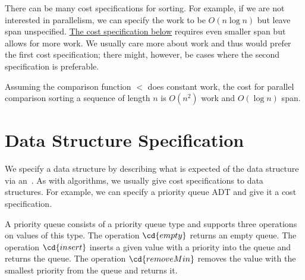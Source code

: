 \begin{cluster}
\label{grp:grm:introduction::spec::cost}

\begin{gram}
\label{grm:introduction::spec::cost}
There can be many cost specifications for sorting.  For example, if we
are not interested in parallelism, we can specify the work to be $O(n
\log{n})$ but leave span unspecified. 
\href{cost:intro::spec::sorting-inefficient}{The cost specification below}
requires even smaller span but allows for more work.
We usually care more about work and thus would prefer the first cost
specification; there might, however, be cases where the second
specification is preferable.

\end{gram}
\end{cluster}

\begin{cluster}
\label{grp:cost:intro::spec::sorting-inefficient}

\begin{costspec}
\label{cost:intro::spec::sorting-inefficient}
Assuming the comparison function $<$ does constant work, the cost for
parallel comparison sorting a sequence of length $n$ is $O(n^2)$ work
and $O(\log n)$ span.

\end{costspec}
\end{cluster}


\section{Data Structure Specification}
\label{sec:introduction::spec::data-structure-specification}

\begin{cluster}
\label{grp:grm:introduction::spec::data}

\begin{gram}
\label{grm:introduction::spec::data}
We specify a data structure by describing what is expected of the data
structure via an~.
As with algorithms, we usually give cost specifications to data
structures.
For example, we can specify a priority queue ADT and give it a cost
specification. 

\end{gram}
\end{cluster}

\begin{cluster}
\label{grp:adt:introduction::spec::priority-queue}

\begin{datatype}
\label{adt:introduction::spec::priority-queue}
A priority queue consists of a priority queue type and supports three
operations on values of this type.  The operation $\cd{empty}$ returns
an empty queue.  The operation $\cd{insert}$ inserts a given value with
a priority into the queue and returns the queue.  The operation
$\cd{removeMin}$ removes the value with the smallest priority from the
queue and returns it.

\end{datatype}
\end{cluster}

